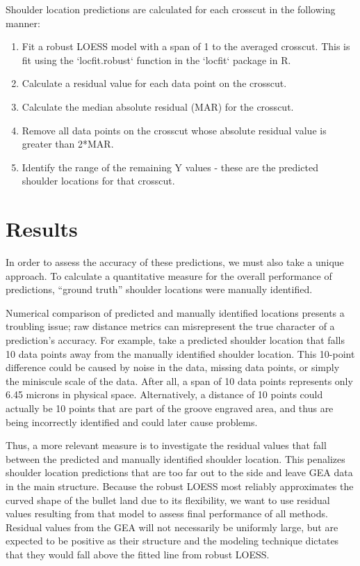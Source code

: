 \documentclass[12pt]{article}
\begin{document}
Shoulder location predictions are calculated for each crosscut in the
following manner:

\begin{enumerate}
\item Fit a robust LOESS model with a span of 1 to the averaged crosscut. This is fit using the `locfit.robust` function in the `locfit` package in R.
\item Calculate a residual value for each data point on the crosscut.  
\item Calculate the median absolute residual (MAR) for the crosscut.  
\item Remove all data points on the crosscut whose absolute residual value is greater than 2*MAR.  
\item Identify the range of the remaining Y values - these are the predicted shoulder locations for that crosscut.   
\end{enumerate}

\section{Results}

In order to assess the accuracy of these predictions, we must also take
a unique approach. To calculate a quantitative measure for the overall
performance of predictions, ``ground truth'' shoulder locations were
manually identified.

Numerical comparison of predicted and manually identified locations
presents a troubling issue; raw distance metrics can misrepresent the
true character of a prediction's accuracy. For example, take a predicted
shoulder location that falls 10 data points away from the manually
identified shoulder location. This 10-point difference could be caused
by noise in the data, missing data points, or simply the miniscule scale
of the data. After all, a span of 10 data points represents only 6.45
microns in physical space. Alternatively, a distance of 10 points could
actually be 10 points that are part of the groove engraved area, and
thus are being incorrectly identified and could later cause problems.

Thus, a more relevant measure is to investigate the residual values that
fall between the predicted and manually identified shoulder location.
This penalizes shoulder location predictions that are too far out to the
side and leave GEA data in the main structure. Because the robust LOESS
most reliably approximates the curved shape of the bullet land due to
its flexibility, we want to use residual values resulting from that
model to assess final performance of all methods. Residual values from
the GEA will not necessarily be uniformly large, but are expected to be
positive as their structure and the modeling technique dictates that
they would fall above the fitted line from robust LOESS.
\end{document}
